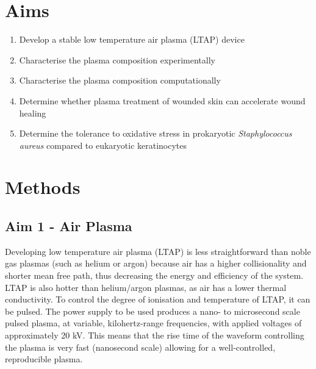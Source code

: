 \documentclass[11pt, oneside]{article}   	%
\begin{document}
\section*{Aims}
\begin{enumerate}
\item Develop a stable low temperature air plasma (LTAP) device
\item Characterise the plasma composition experimentally
\item Characterise the plasma composition computationally
\item Determine whether plasma treatment of wounded skin can accelerate wound healing%
\item Determine the tolerance to oxidative stress in prokaryotic \textit{Staphylococcus aureus} compared to eukaryotic keratinocytes
\end{enumerate}

\section*{Methods}
\subsection*{Aim 1 - Air Plasma}

Developing low temperature air plasma (LTAP) is less straightforward than noble gas plasmas (such as helium or argon) because air has a higher collisionality and shorter mean free path, thus decreasing the energy and efficiency of the system.
LTAP is also hotter than helium/argon plasmas, as air has a lower thermal conductivity.
To control the degree of ionisation and temperature of LTAP, it can be pulsed.
The power supply to be used produces a nano- to microsecond scale pulsed plasma, at variable, kilohertz-range frequencies, with applied voltages of approximately 20 kV. 
This means that the rise time of the waveform controlling the plasma is very fast (nanosecond scale) allowing for a well-controlled, reproducible plasma.
\end{document}
